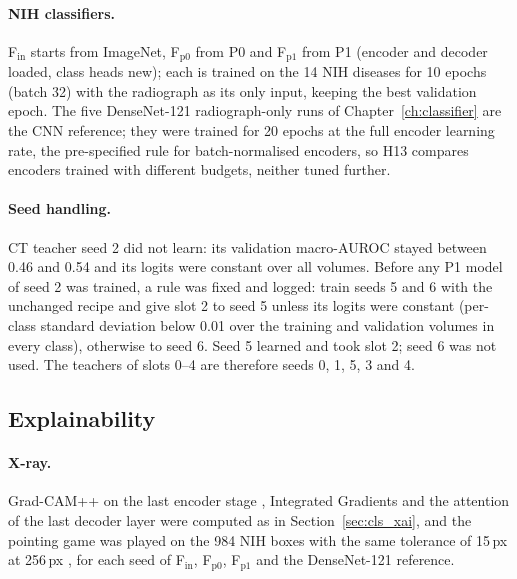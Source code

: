 \paragraph{NIH classifiers.} F$_\mathrm{in}$ starts from ImageNet, F$_\mathrm{p0}$ from P0 and F$_\mathrm{p1}$ from P1 (encoder and
decoder loaded, class heads new); each is trained on the 14 NIH diseases for 10 epochs (batch 32) with the radiograph as its only input,
keeping the best validation epoch. The five DenseNet-121 radiograph-only runs of Chapter~\ref{ch:classifier} are the CNN reference; they
were trained for 20 epochs at the full encoder learning rate, the pre-specified rule for batch-normalised encoders, so H13 compares
encoders trained with different budgets, neither tuned further.

\paragraph{Seed handling.} CT teacher seed 2 did not learn: its validation macro-AUROC stayed between 0.46 and 0.54 and its logits were
constant over all volumes. Before any P1 model of seed 2 was trained, a rule was fixed and logged: train seeds 5 and 6 with the unchanged
recipe and give slot 2 to seed 5 unless its logits were constant (per-class standard deviation below 0.01 over the training and validation
volumes in every class), otherwise to seed 6. Seed 5 learned and took slot 2; seed 6 was not used. The teachers of slots 0--4 are
therefore seeds 0, 1, 5, 3 and 4.

\subsection{Explainability}
\label{sec:xm_xai}
\paragraph{X-ray.} Grad-CAM++ on the last encoder stage \citep{chattopadhay2018gradcampp}, Integrated Gradients
\citep{sundararajan2017axiomatic} and the attention of the last decoder layer were computed as in Section~\ref{sec:cls_xai}, and the
pointing game was played on the 984 NIH boxes with the same tolerance of 15\,px at 256\,px \citep{zhang2018topdown}, for each seed of
F$_\mathrm{in}$, F$_\mathrm{p0}$, F$_\mathrm{p1}$ and the DenseNet-121 reference.

